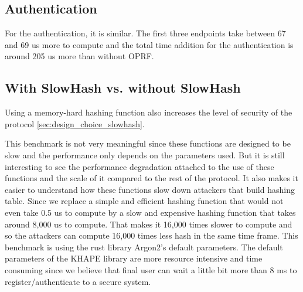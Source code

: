 ﻿\documentclass[../report.tex]{subfiles}
\begin{document}
\subsection*{Authentication}
For the authentication, it is similar. The first three endpoints take between 67 and 69 us more to compute and the total time addition for the authentication is around 205 us more than without OPRF.
\subsection{With SlowHash vs. without SlowHash} %
Using a memory-hard hashing function also increases the level of security of the protocol \ref{sec:design_choice_slowhash}.

This benchmark is not very meaningful since these functions are designed to be slow and the performance only depends on the parameters used. But it is still interesting to see the performance degradation attached to the use of these functions and the scale of it compared to the rest of the protocol.
It also makes it easier to understand how these functions slow down attackers that build hashing table. Since we replace a simple and efficient hashing function that would not even take 0.5 us to compute by a slow and expensive hashing function that takes around 8,000 us to compute. That makes it 16,000 times slower to compute and so the attackers can compute 16,000 times less hash in the same time frame.
This benchmark is using the rust library Argon2's default parameters. The default parameters of the KHAPE library are more resource intensive and time consuming since we believe that final user can wait a little bit more than 8 ms to register/authenticate to a secure system.
\end{document}
